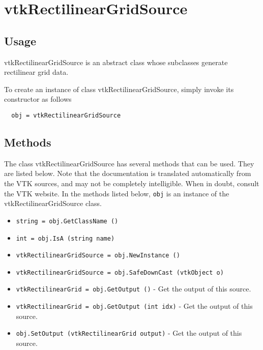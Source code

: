 \section{vtkRectilinearGridSource}

\subsection{Usage}

 vtkRectilinearGridSource is an abstract class whose subclasses generate
 rectilinear grid data.

To create an instance of class vtkRectilinearGridSource, simply
invoke its constructor as follows
\begin{verbatim}
  obj = vtkRectilinearGridSource
\end{verbatim}
\subsection{Methods}

The class vtkRectilinearGridSource has several methods that can be used.
  They are listed below.
Note that the documentation is translated automatically from the VTK sources,
and may not be completely intelligible.  When in doubt, consult the VTK website.
In the methods listed below, \verb|obj| is an instance of the vtkRectilinearGridSource class.
\begin{itemize}
\item  \verb|string = obj.GetClassName ()|

\item  \verb|int = obj.IsA (string name)|

\item  \verb|vtkRectilinearGridSource = obj.NewInstance ()|

\item  \verb|vtkRectilinearGridSource = obj.SafeDownCast (vtkObject o)|

\item  \verb|vtkRectilinearGrid = obj.GetOutput ()| -  Get the output of this source.

\item  \verb|vtkRectilinearGrid = obj.GetOutput (int idx)| -  Get the output of this source.

\item  \verb|obj.SetOutput (vtkRectilinearGrid output)| -  Get the output of this source.

\end{itemize}
